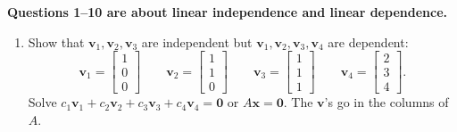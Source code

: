 \documentclass[14pt, a4paper]{article}
\begin{document}
\noindent \textbf{Questions 1--10 are about linear independence and linear dependence.}
\begin{enumerate}
    \item Show that $\boldsymbol{v}_1, \boldsymbol{v}_2, \boldsymbol{v}_3$ are independent but $\boldsymbol{v}_1, \boldsymbol{v}_2, \boldsymbol{v}_3, \boldsymbol{v}_4$ are dependent:
          \[
              \boldsymbol{v}_1 = \begin{bmatrix} 1 \\ 0 \\ 0 \end{bmatrix} \qquad
              \boldsymbol{v}_2 = \begin{bmatrix} 1 \\ 1 \\ 0 \end{bmatrix} \qquad
              \boldsymbol{v}_3 = \begin{bmatrix} 1 \\ 1 \\ 1 \end{bmatrix} \qquad
              \boldsymbol{v}_4 = \begin{bmatrix} 2 \\ 3 \\ 4 \end{bmatrix}.
          \]
          Solve $c_1\boldsymbol{v}_1 + c_2\boldsymbol{v}_2 + c_3\boldsymbol{v}_3 + c_4\boldsymbol{v}_4 = \boldsymbol{0}$ or $A\boldsymbol{x} = \boldsymbol{0}$. The $\boldsymbol{v}$'s go in the columns of $A$.


\end{enumerate}
\end{document}
